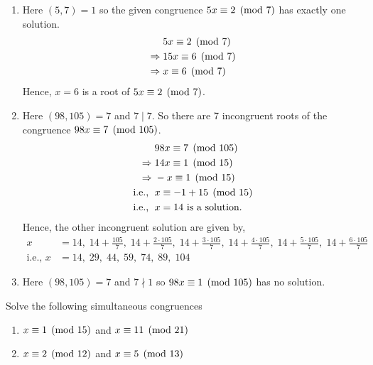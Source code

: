 \documentclass[12pt]{book}
\begin{document}
\begin{soln}\hfill
    \begin{enumerate}[label=(\alph*)]
        \item Here $ (5,7)=1 $ so the given congruence $ 5x\equiv 2 \pmod{7} $ has exactly one solution.
        \begin{align*}
            &5x\equiv 2 \pmod{7}\\
            \Rightarrow\;&15x\equiv 6 \pmod{7}\\
            \Rightarrow\;&x\equiv 6 \pmod{7}
        \end{align*}
        Hence, $ x=6 $ is a root of $ 5x\equiv 2 \pmod{7} $.
        \item Here $ (98,105)=7 $ and $ 7\mid7 $. So there are 7 incongruent roots of the congruence $ 98x\equiv 7 \pmod{105} $.
        \begin{align*}
            & 98x\equiv 7 \pmod{105}\\
            \Rightarrow\;& 14x\equiv 1 \pmod{15}\\
            \Rightarrow\;& -x\equiv 1 \pmod{15}\\
            \text{i.e., }\;& x\equiv -1+15 \pmod{15}\\
            \text{i.e., }\;& x=14 \text{ is a solution.}
        \end{align*}
        Hence, the other incongruent solution are given by,
        \begin{align*}
            x&=14,\;14+\frac{105}{7},\;14+\frac{2\cdot105}{7},\;14+\frac{3\cdot105}{7},\;14+\frac{4\cdot105}{7},\;14+\frac{5\cdot105}{7},\;14+\frac{6\cdot105}{7}\\
            \text{i.e., }x&=14,\;29,\;44,\;59,\;74,\;89,\;104
        \end{align*}
        \item Here $ (98,105)=7 $ and $ 7\nmid 1 $ so $ 98x\equiv 1 \pmod{105} $ has no solution.
    \end{enumerate}
\end{soln}
\begin{qn}
    Solve the following simultaneous congruences
    \begin{enumerate}[label=(\alph*)]
        \item $ x\equiv 1 \pmod{15} $ and $ x\equiv 11 \pmod{21} $
        \item $ x\equiv 2 \pmod{12} $ and $ x\equiv 5 \pmod{13} $
    \end{enumerate}
\end{qn}
\end{document}
